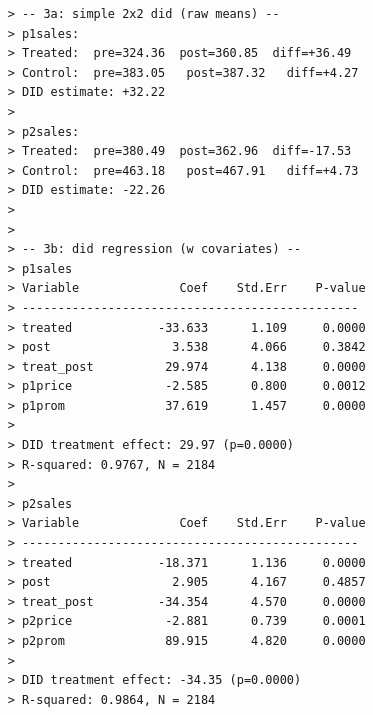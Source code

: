 \documentclass[10pt]{article}
\begin{document}
\begin{verbatim}
    > -- 3a: simple 2x2 did (raw means) --
    > p1sales:
    > Treated:  pre=324.36  post=360.85  diff=+36.49
    > Control:  pre=383.05   post=387.32   diff=+4.27
    > DID estimate: +32.22
    > 
    > p2sales:
    > Treated:  pre=380.49  post=362.96  diff=-17.53
    > Control:  pre=463.18   post=467.91   diff=+4.73
    > DID estimate: -22.26
    > 
    > 
    > -- 3b: did regression (w covariates) --
    > p1sales
    > Variable              Coef    Std.Err    P-value
    > -----------------------------------------------
    > treated            -33.633      1.109     0.0000
    > post                 3.538      4.066     0.3842
    > treat_post          29.974      4.138     0.0000
    > p1price             -2.585      0.800     0.0012
    > p1prom              37.619      1.457     0.0000
    > 
    > DID treatment effect: 29.97 (p=0.0000)
    > R-squared: 0.9767, N = 2184
    > 
    > p2sales
    > Variable              Coef    Std.Err    P-value
    > -----------------------------------------------
    > treated            -18.371      1.136     0.0000
    > post                 2.905      4.167     0.4857
    > treat_post         -34.354      4.570     0.0000
    > p2price             -2.881      0.739     0.0001
    > p2prom              89.915      4.820     0.0000
    > 
    > DID treatment effect: -34.35 (p=0.0000)
    > R-squared: 0.9864, N = 2184
\end{verbatim}
\end{document}
